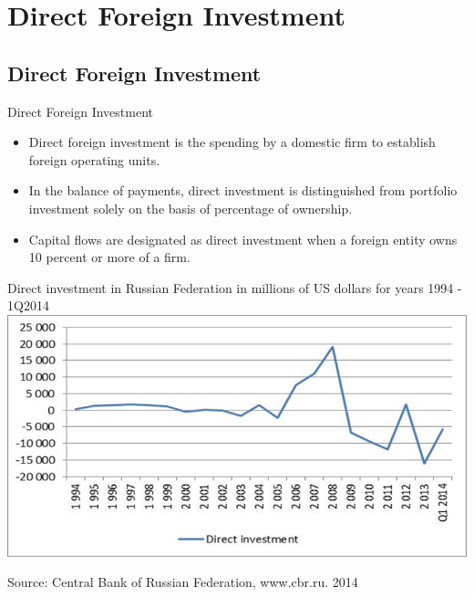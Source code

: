 \documentclass[international_finance_p2.tex]{subfiles}
\begin{document}
\section{Direct Foreign Investment}

\subsection{Direct Foreign Investment}
\begin{frame}{Direct Foreign Investment}
\begin{itemize}[<+->]
\item
Direct foreign investment is the spending by a domestic firm to establish foreign operating units. 
\item
In the balance of payments, direct investment is distinguished from portfolio investment solely on the basis of percentage of ownership.
\item
Capital flows are designated as direct investment when a foreign entity owns 10 percent or more of a firm.
\end{itemize}
\end{frame}
\begin{frame}{Direct investment in Russian Federation}
{in millions of US dollars for years 1994 - 1Q2014}
\includegraphics[scale=0.5]{img/fdirus}

Source: Central Bank of Russian Federation, www.cbr.ru. 2014
\end{frame}
\end{document}
